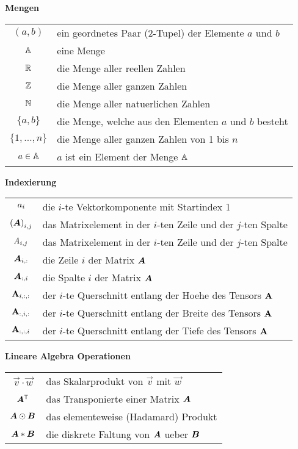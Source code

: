 \begin{center}\textbf{Mengen}\end{center}
\begin{tabular}{cl}
  $(a,b)$ & ein geordnetes Paar (2-Tupel) der Elemente $a$ und $b$ \\
  $\mathbb{A}$ & eine Menge \\
  $\mathbb{R}$ & die Menge aller reellen Zahlen \\
  $\mathbb{Z}$ & die Menge aller ganzen Zahlen \\
  $\mathbb{N}$ & die Menge aller natuerlichen Zahlen \\
  $\{a,b\}$ & die Menge, welche aus den Elementen $a$ und $b$ besteht \\
  $\{1,\ldots,n\}$ & die Menge aller ganzen Zahlen von 1 bis $n$ \\
  $a \in \mathbb{A}$ & $a$ ist ein Element der Menge $\mathbb{A}$ \\

\end{tabular}

\begin{center}\textbf{Indexierung}\end{center}
\begin{tabular}{cl}
  $a_i$ & die $i$-te Vektorkomponente mit Startindex 1 \\
  ${(\bm{A})}_{i,j}$ & das Matrixelement in der $i$-ten Zeile und der $j$-ten Spalte \\
  $\mathit{A}_{i,j}$ & das Matrixelement in der $i$-ten Zeile und der $j$-ten Spalte \\
  $\bm{A}_{i,:}$ & die Zeile $i$ der Matrix $\bm{A}$ \\
  $\bm{A}_{:,i}$ & die Spalte $i$ der Matrix $\bm{A}$\ \\
  $\mathbf{A}_{i,:,:}$ & der $i$-te Querschnitt entlang der Hoehe des Tensors $\mathbf{A}$ \\
  $\mathbf{A}_{:,i,:}$ & der $i$-te Querschnitt entlang der Breite des Tensors $\mathbf{A}$ \\
  $\mathbf{A}_{:,:,i}$ & der $i$-te Querschnitt entlang der Tiefe des Tensors $\mathbf{A}$ \\

\end{tabular}

\begin{center}\textbf{Lineare Algebra Operationen}\end{center}
\begin{tabular}{cl}
  $\vec{v} \cdot \vec{w}$ & das Skalarprodukt von $\vec{v}$ mit $\vec{w}$ \\
  $\bm{A}^{\mathsf{T}}$ & das Transponierte einer Matrix $\bm{A}$ \\
  $\bm{A} \odot \bm{B}$ & das elementeweise (Hadamard) Produkt \\
  $\bm{A} * \bm{B}$ & die diskrete Faltung von $\bm{A}$ ueber $\bm{B}$

\end{tabular}

